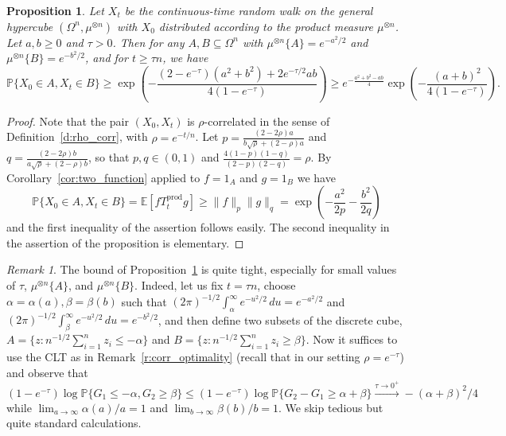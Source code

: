 \documentclass[11pt]{amsart}
\newcommand{\E}{\mathbb{E}}
\newcommand{\PP}{\mathbb{P}}
\newcommand{\1}{\mathbf{1}}
\def\E{{\mathbb E}}
\theoremstyle{definition}
\theoremstyle{plain}
\newtheorem{proposition}[example]{Proposition}
\theoremstyle{remark}
\newtheorem{remark}[example]{Remark}
\numberwithin{equation}{section}
\begin{document}
\begin{proposition} \label{p:ct_rw_improved}
Let $X_t$ be the continuous-time random walk on the general hypercube $(\Omega^n, \mu^{\otimes n})$ with $X_0$
distributed according to the product measure $\mu^{\otimes n}$. Let $a, b \geq 0$ and $\tau>0$.
Then for any $A, B \subseteq\Omega^n$ with $\mu^{\otimes n} \{A\} = e^{ -a^2/2}$ and  $\mu^{\otimes n} \{B\} = e^{ -b^2/2}$, and for $t \ge \tau n$, we have
\begin{equation*}
\PP\{ X_0 \in A, X_t \in B \} \ge \exp \left( -\frac{(2-e^{-\tau})(a^2 + b^2)+ 2 e^{-\tau/2}ab}{4(1- e^{-\tau})} \right) \geq
e^{-\frac{a^{2}+b^{2}-ab}{4}}\exp\left(-\frac{(a+b)^{2}}{4(1-e^{-\tau})}\right).
\end{equation*}
\end{proposition}

\begin{proof}
Note that the pair $(X_{0}, X_{t})$ is $\rho$-correlated in the sense of Definition~\ref{d:rho_corr}, with $\rho=e^{-t/n}$.
Let $p=\frac{(2-2\rho)a}{b\sqrt{\rho}+(2-\rho)a}$ and $q=\frac{(2-2\rho)b}{a\sqrt{\rho}+(2-\rho)b}$, so that $p,q \in (0,1)$ and
$\frac{4(1-p)(1-q)}{(2-p)(2-q)}=\rho$. By Corollary~\ref{cor:two_function} applied to $f=1_{A}$ and $g=1_{B}$ we have
\[
\PP\{ X_0 \in A, X_t \in B \}=\E[fT^\mathrm{prod}_t g] \geq \| f\|_{p}\| g\|_{q}=\exp\left(-\frac{a^{2}}{2p}-\frac{b^{2}}{2q}\right)
\]
and the first inequality of the assertion follows easily. The second inequality in the assertion of the proposition is elementary.
\end{proof}

\begin{remark}
The bound of Proposition~\ref{p:ct_rw_improved} is quite tight, especially for small values of $\tau$, $\mu^{\otimes n} \{A\}$, and
$\mu^{\otimes n} \{B\}$. Indeed, let us fix $t=\tau n$, choose $\alpha=\alpha(a), \beta=\beta(b)$ such that
$(2\pi)^{-1/2}\int_{\alpha}^{\infty} e^{-u^{2}/2}\,du=e^{-a^{2}/2}$ and $(2\pi)^{-1/2}\int_{\beta}^{\infty} e^{-u^{2}/2}\,du=e^{-b^{2}/2}$, and then define two subsets of the discrete cube, $A=\{ z: n^{-1/2}\sum_{i=1}^{n} z_{i} \leq -\alpha \}$ and
$B=\{ z: n^{-1/2}\sum_{i=1}^{n} z_{i} \geq \beta \}$. Now it suffices to use the CLT as in Remark~\ref{r:corr_optimality} 
(recall that in our setting $\rho=e^{-\tau}$) and observe that
\[
(1-e^{-\tau})\log \PP\{ G_{1} \leq -\alpha, G_{2} \geq \beta \} \leq (1-e^{-\tau})\log \PP\{ G_{2}-G_{1} \geq \alpha+\beta\}
\stackrel{\tau \to 0^{+}}{\longrightarrow} -(\alpha+\beta)^{2}/4
\]
while $\lim_{a \to \infty} \alpha(a)/a=1$ and $\lim_{b \to \infty} \beta(b)/b=1$. We skip tedious but quite standard calculations.
\end{remark}
\end{document}
